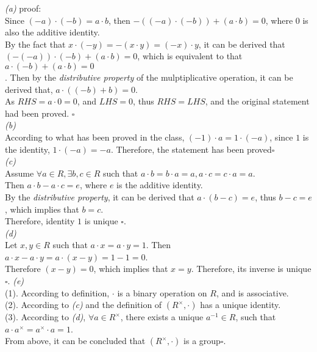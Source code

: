 \documentclass[11pt]{article}
\newenvironment{problem}[2][Problem]{\begin{trivlist}
\item[\hskip \labelsep {\bfseries #1}\hskip \labelsep {\bfseries #2.}]}{\end{trivlist}}
\begin{document}
\begin{problem}{3}
\textit{(a)} proof:\\
Since $(-a) \cdot (-b) = a \cdot b$, then $ -((-a) \cdot (-b)) + (a\cdot b) = 0$, where $0$ is also the additive identity.\\
By the fact that $x \cdot (-y) = -(x \cdot y) = (-x) \cdot y$, it can be derived that $(-(-a))\cdot (-b) + (a\cdot b) =0$, which is equivalent to that $a \cdot (-b) + (a\cdot b) = 0$\\.
Then by the \textit{distributive property} of the mulptiplicative operation, it can be derived that,
$a \cdot ((-b) + b) =0$.\\
As $RHS = a \cdot 0 = 0$, and $LHS = 0$, thus $RHS =LHS$, and the original statement had been proved. $\square$\\
\textit{(b)}\\
According to what has been proved in the class, $(-1) \cdot a = 1 \cdot (-a)$, since $1$ is the identity, $1 \cdot (-a) = -a$. Therefore, the statement has been proved$\square$\\
\textit{(c)}\\
Assume $\forall a \in R, \exists b,c \in R$ such that $a \cdot b = b\cdot a = a, a\cdot c = c\cdot a = a$.\\
Then $a\cdot b - a\cdot c = e$, where $e$ is the additive identity.\\
By the \textit{distributive property}, it can be derived that $a\cdot (b - c) = e$, thus $b-c = e$, which implies that $ b= c$.\\
Therefore, identity $1$ is unique $\square$.\\
\textit{(d)}\\
Let $x,y \in R$ such that $a \cdot x = a\cdot y =1$. Then $a\cdot x - a\cdot y =a \cdot (x - y) =1 - 1 =0$.\\
Therefore $(x-y) = 0$, which implies that $x = y$. Therefore, its inverse is unique$\square$.
\textit{(e)}\\
(1). According to definition, $\cdot$ is a binary operation on $R$, and is associative.\\
(2). According to \textit{(c)} and the definition of $(R^{\times}, \cdot)$ has a unique identity.\\
(3). According to \textit{(d)}, $\forall a \in R^{\times}$, there exists a unique $a^{-1}\in R$, such that $a \cdot a^{\times} = a^{\times}\cdot a = 1$.\\
From above, it can be concluded that $(R^{\times},\cdot)$ is a group$\square$.
\end{problem}
\end{document}
